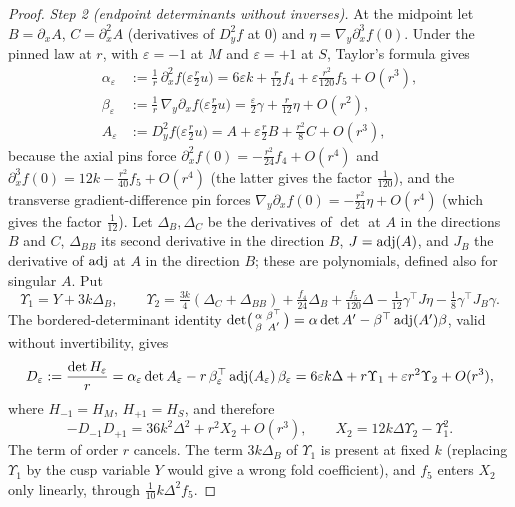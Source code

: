\begin{proof}
\emph{Step 2 (endpoint determinants without inverses).} At the midpoint let $B=\partial_xA$, $C=\partial_x^2A$ (derivatives of $D_y^2f$ at $0$) and $\eta=\nabla_y\partial_x^3f(0)$. Under the pinned law at $r$, with $\varepsilon=-1$ at $M$ and $\varepsilon=+1$ at $S$, Taylor's formula gives
\begin{equation}\label{eq:ctwo-endpoint}
\begin{aligned}
\alpha_\varepsilon&:=\tfrac1r\,\partial_x^2f\bigl(\varepsilon\tfrac r2u\bigr)=6\varepsilon k+\tfrac r{12}f_4+\varepsilon\tfrac{r^2}{120}f_5+O(r^3),\\
\beta_\varepsilon&:=\tfrac1r\,\nabla_y\partial_xf\bigl(\varepsilon\tfrac r2u\bigr)=\tfrac\varepsilon2\gamma+\tfrac r{12}\eta+O(r^2),\\
A_\varepsilon&:=D_y^2f\bigl(\varepsilon\tfrac r2u\bigr)=A+\varepsilon\tfrac r2B+\tfrac{r^2}8C+O(r^3),
\end{aligned}
\end{equation}
because the axial pins force $\partial_x^2f(0)=-\frac{r^2}{24}f_4+O(r^4)$ and $\partial_x^3f(0)=12k-\frac{r^2}{40}f_5+O(r^4)$ (the latter gives the factor $\frac1{120}$), and the transverse gradient-difference pin forces $\nabla_y\partial_xf(0)=-\frac{r^2}{24}\eta+O(r^4)$ (which gives the factor $\frac1{12}$). Let $\Delta_B,\Delta_C$ be the derivatives of $\det$ at $A$ in the directions $B$ and $C$, $\Delta_{BB}$ its second derivative in the direction $B$, $J=\operatorname{adj}(A)$, and $J_B$ the derivative of $\operatorname{adj}$ at $A$ in the direction $B$; these are polynomials, defined also for singular $A$. Put
\begin{equation}\label{eq:ctwo-Ups}
\Upsilon_1=Y+3k\Delta_B,\qquad
\Upsilon_2=\tfrac{3k}4(\Delta_C+\Delta_{BB})+\tfrac{f_4}{24}\Delta_B+\tfrac{f_5}{120}\Delta-\tfrac1{12}\gamma^{\top}J\eta-\tfrac18\gamma^{\top}J_B\gamma .
\end{equation}
The bordered-determinant identity $\det\bigl(\begin{smallmatrix}\alpha&\beta^{\top}\\ \beta&A'\end{smallmatrix}\bigr)=\alpha\det A'-\beta^{\top}\operatorname{adj}(A')\beta$, valid without invertibility, gives
\[
D_\varepsilon:=\frac{\det H_\varepsilon}r=\alpha_\varepsilon\det A_\varepsilon-r\,\beta_\varepsilon^{\top}\operatorname{adj}(A_\varepsilon)\,\beta_\varepsilon=6\varepsilon k\Delta+r\Upsilon_1+\varepsilon r^2\Upsilon_2+O(r^3),
\]
where $H_{-1}=H_M$, $H_{+1}=H_S$, and therefore
\begin{equation}\label{eq:ctwo-X2}
-D_{-1}D_{+1}=36k^2\Delta^2+r^2X_2+O(r^3),\qquad X_2=12k\Delta\Upsilon_2-\Upsilon_1^2 .
\end{equation}
The term of order $r$ cancels. The term $3k\Delta_B$ of $\Upsilon_1$ is present at fixed $k$ (replacing $\Upsilon_1$ by the cusp variable $Y$ would give a wrong fold coefficient), and $f_5$ enters $X_2$ only linearly, through $\frac1{10}k\Delta^2f_5$.


\end{proof}
